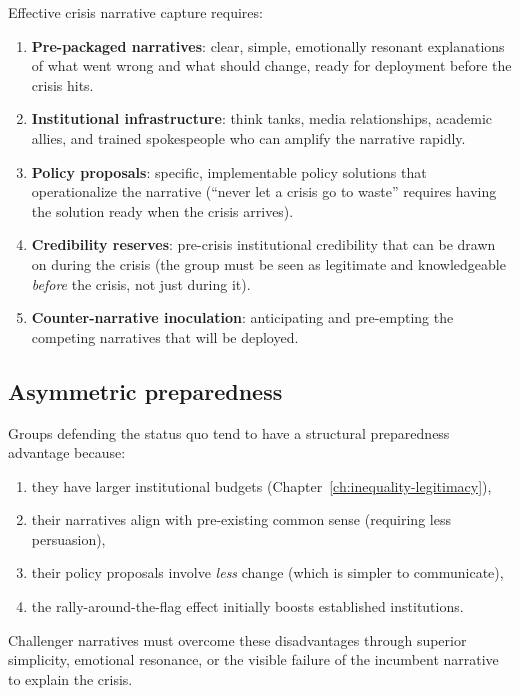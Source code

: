 \begin{model}
\label{mod:preparedness}
Effective crisis narrative capture requires:
\begin{enumerate}[nosep]
  \item \textbf{Pre-packaged narratives}: clear, simple, emotionally resonant explanations of what went wrong and what should change, ready for deployment before the crisis hits.
  \item \textbf{Institutional infrastructure}: think tanks, media relationships, academic allies, and trained spokespeople who can amplify the narrative rapidly.
  \item \textbf{Policy proposals}: specific, implementable policy solutions that operationalize the narrative (``never let a crisis go to waste'' requires having the solution ready when the crisis arrives).
  \item \textbf{Credibility reserves}: pre-crisis institutional credibility that can be drawn on during the crisis (the group must be seen as legitimate and knowledgeable \emph{before} the crisis, not just during it).
  \item \textbf{Counter-narrative inoculation}: anticipating and pre-empting the competing narratives that will be deployed.
\end{enumerate}
\end{model}

\subsection{Asymmetric preparedness}

\begin{proposition}
\label{prop:conservative-advantage}
Groups defending the status quo tend to have a structural preparedness advantage because:
\begin{enumerate}[nosep]
  \item they have larger institutional budgets (Chapter~\ref{ch:inequality-legitimacy}),
  \item their narratives align with pre-existing common sense (requiring less persuasion),
  \item their policy proposals involve \emph{less} change (which is simpler to communicate),
  \item the rally-around-the-flag effect initially boosts established institutions.
\end{enumerate}
Challenger narratives must overcome these disadvantages through superior simplicity, emotional resonance, or the visible failure of the incumbent narrative to explain the crisis.
\end{proposition}

